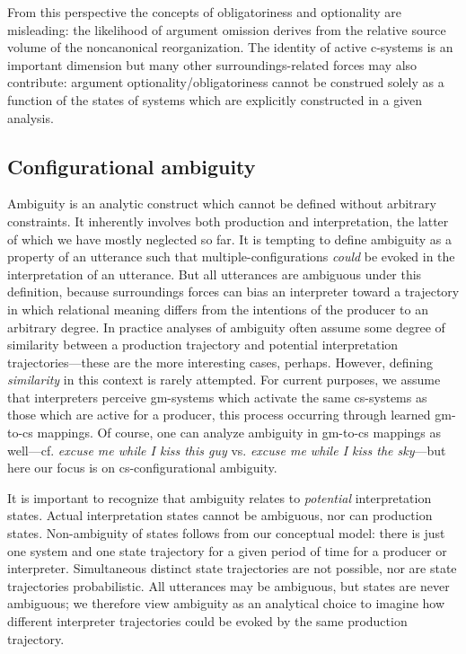  From this perspective the concepts of obligatoriness and optionality are misleading: the likelihood of argument omission derives from the relative source volume of the noncanonical reorganization. The identity of active c-systems is an important dimension but many other surroundings-related forces may also contribute: argument optionality/obligatoriness cannot be construed solely as a function of the states of systems which are explicitly constructed in a given analysis.

\subsection{Configurational ambiguity}

Ambiguity is an analytic construct which cannot be defined without arbitrary constraints. It inherently involves both production and interpretation, the latter of which we have mostly neglected so far. It is tempting to define ambiguity as a property of an utterance such that multiple-configurations \textit{could} be evoked in the interpretation of an utterance. But all utterances are ambiguous under this definition, because surroundings forces can bias an interpreter toward a trajectory in which relational meaning differs from the intentions of the producer to an arbitrary degree. In practice analyses of ambiguity often assume some degree of similarity between a production trajectory and potential interpretation trajectories—these are the more interesting cases, perhaps. However, defining \textit{similarity} in this context is rarely attempted. For current purposes, we assume that interpreters perceive gm-systems which activate the same cs-systems as those which are active for a producer, this process occurring through learned gm-to-cs mappings. Of course, one can analyze ambiguity in gm-to-cs mappings as well—cf. \textit{excuse me while I kiss this guy} vs. \textit{excuse me while I kiss the sky}—but here our focus is on cs-configurational ambiguity. 

  It is important to recognize that ambiguity relates to \textit{potential} interpretation states. Actual interpretation states cannot be ambiguous, nor can production states. Non-ambiguity of states follows from our conceptual model: there is just one system and one state trajectory for a given period of time for a producer or interpreter. Simultaneous distinct state trajectories are not possible, nor are state trajectories probabilistic. All utterances may be ambiguous, but states are never ambiguous; we therefore view ambiguity as an analytical choice to imagine how different interpreter trajectories could be evoked by the same production trajectory.

